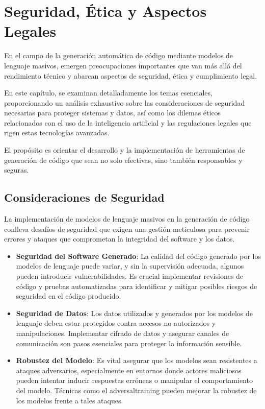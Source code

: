 \chapter{Seguridad, Ética y Aspectos Legales}
\label{chap:etica}

\lettrine{E}{}n el campo de la generación automática de código mediante modelos de lenguaje masivos, emergen preocupaciones importantes que van más allá del rendimiento técnico y abarcan aspectos de seguridad, ética y cumplimiento legal.

En este capítulo, se examinan detalladamente los temas esenciales, proporcionando un análisis exhaustivo sobre las consideraciones de seguridad necesarias para proteger sistemas y datos, así como los dilemas éticos relacionados con el uso de la inteligencia artificial y las regulaciones legales que rigen estas tecnologías avanzadas.

El propósito es orientar el desarrollo y la implementación de herramientas de generación de código que sean no solo efectivas, sino también responsables y seguras.


\section{Consideraciones de Seguridad}

La implementación de modelos de lenguaje masivos en la generación de código conlleva desafíos de seguridad que exigen una gestión meticulosa para prevenir errores y ataques que comprometan la integridad del software y los datos.

\begin{itemize}
    \item \textbf{Seguridad del Software Generado}: La calidad del código generado por los modelos de lenguaje puede variar, y sin la supervisión adecuada, algunos pueden introducir vulnerabilidades. Es crucial implementar revisiones de código y pruebas automatizadas para identificar y mitigar posibles riesgos de seguridad en el código producido.
    
    \item \textbf{Seguridad de Datos}: Los datos utilizados y generados por los modelos de lenguaje deben estar protegidos contra accesos no autorizados y manipulaciones. Implementar cifrado de datos y asegurar canales de comunicación son pasos esenciales para proteger la información sensible.
    
    \item \textbf{Robustez del Modelo}: Es vital asegurar que los modelos sean resistentes a ataques adversarios, especialmente en entornos donde actores maliciosos pueden intentar inducir respuestas erróneas o manipular el comportamiento del modelo. Técnicas como el \gls{adversaltraining} pueden mejorar la robustez de los modelos frente a tales ataques.
\end{itemize}

